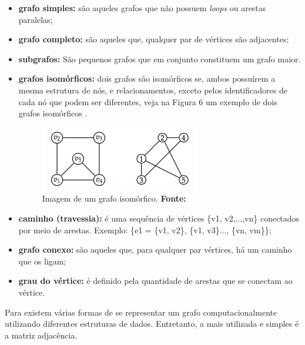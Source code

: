 \begin{itemize}
	\item \textbf{grafo simples:} são aqueles grafos que não possuem \textit{loops} ou arestas paralelas;
	
	\item \textbf{grafo completo:} são aqueles que, qualquer par de vértices são adjacentes;
	
	\item \textbf{subgrafos:} São pequenos grafos que em conjunto constituem um grafo maior.
	
	\item \textbf{grafos isomórficos:} dois grafos são isomórficos se, ambos possuírem a mesma estrutura de nós, e relacionamentos, exceto pelos identificadores de cada nó que podem ser diferentes, veja na Figura 6 um exemplo de dois grafos isomórficos \cite{harju_graph_theory}.
	
	\begin{figure}[h!]
		\centerline{\includegraphics[scale=1]{./imagens/grafos_isomorficos.png}}
		\caption[Imagem de um grafo isomórfico]
		{Imagem de um grafo isomórfico. \textbf{Fonte:} }
		\label{fig:exemplo1}
	\end{figure}
	
	\item \textbf{caminho (travessia):} é uma sequência de vértices \{v1, v2,...,vn\} conectados por meio de arestas. Exemplo: \{e1 = \{v1, v2\}, \{v1, v3\}..., \{vn, vm\}\};

	\item \textbf{grafo conexo:} são aqueles que, para qualquer par vértices, há um caminho que os ligam;
	
	\item \textbf{grau do vértice:} é definido pela quantidade de arestas que se conectam ao vértice.
	
\end{itemize}

Para  existem várias formas de se representar um grafo computacionalmente utilizando diferentes estruturas de dados. Entretanto, a mais utilizada e simples é a matriz adjacência.

